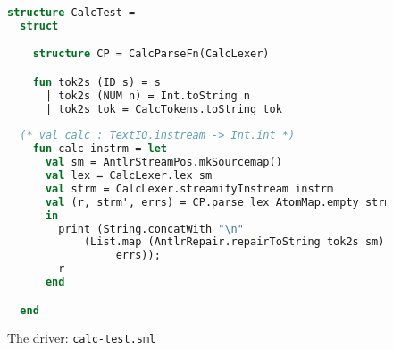 \begin{figure}
\begin{lstlisting}[language=SML]
structure CalcTest =
  struct

    structure CP = CalcParseFn(CalcLexer)

    fun tok2s (ID s) = s
      | tok2s (NUM n) = Int.toString n
      | tok2s tok = CalcTokens.toString tok
      
  (* val calc : TextIO.instream -> Int.int *)
    fun calc instrm = let
      val sm = AntlrStreamPos.mkSourcemap()
      val lex = CalcLexer.lex sm
      val strm = CalcLexer.streamifyInstream instrm
      val (r, strm', errs) = CP.parse lex AtomMap.empty strm
      in
        print (String.concatWith "\n" 
            (List.map (AntlrRepair.repairToString tok2s sm) 
                 errs));
        r
      end

  end
\end{lstlisting}
\caption{The driver: {\tt calc-test.sml}}
\label{fig:calc-test}
\end{figure}%
